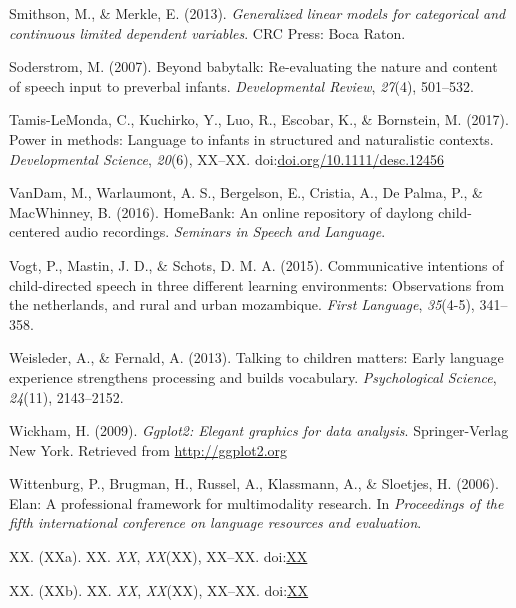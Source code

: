 \documentclass[floatsintext,man]{apa6}
\theoremstyle{definition}
\theoremstyle{definition}
\theoremstyle{definition}
\theoremstyle{remark}
\begin{document}
\hypertarget{ref-smithson2013generalized}{}
Smithson, M., \& Merkle, E. (2013). \emph{Generalized linear models for
categorical and continuous limited dependent variables}. CRC Press: Boca
Raton.

\hypertarget{ref-soderstrom2007beyond}{}
Soderstrom, M. (2007). Beyond babytalk: Re-evaluating the nature and
content of speech input to preverbal infants. \emph{Developmental
Review}, \emph{27}(4), 501--532.

\hypertarget{ref-tamislemonda2017power}{}
Tamis-LeMonda, C., Kuchirko, Y., Luo, R., Escobar, K., \& Bornstein, M.
(2017). Power in methods: Language to infants in structured and
naturalistic contexts. \emph{Developmental Science}, \emph{20}(6),
XX--XX.
doi:\href{https://doi.org/doi.org/10.1111/desc.12456}{doi.org/10.1111/desc.12456}

\hypertarget{ref-HomeBank}{}
VanDam, M., Warlaumont, A. S., Bergelson, E., Cristia, A., De Palma, P.,
\& MacWhinney, B. (2016). HomeBank: An online repository of daylong
child-centered audio recordings. \emph{Seminars in Speech and Language}.

\hypertarget{ref-vogt2015communicative}{}
Vogt, P., Mastin, J. D., \& Schots, D. M. A. (2015). Communicative
intentions of child-directed speech in three different learning
environments: Observations from the netherlands, and rural and urban
mozambique. \emph{First Language}, \emph{35}(4-5), 341--358.

\hypertarget{ref-weisleder2013talking}{}
Weisleder, A., \& Fernald, A. (2013). Talking to children matters: Early
language experience strengthens processing and builds vocabulary.
\emph{Psychological Science}, \emph{24}(11), 2143--2152.

\hypertarget{ref-R-ggplot2}{}
Wickham, H. (2009). \emph{Ggplot2: Elegant graphics for data analysis}.
Springer-Verlag New York. Retrieved from \url{http://ggplot2.org}

\hypertarget{ref-ELAN}{}
Wittenburg, P., Brugman, H., Russel, A., Klassmann, A., \& Sloetjes, H.
(2006). Elan: A professional framework for multimodality research. In
\emph{Proceedings of the fifth international conference on language
resources and evaluation}.

\hypertarget{ref-lucidIP}{}
XX. (XXa). XX. \emph{XX}, \emph{XX}(XX), XX--XX.
doi:\href{https://doi.org/XX}{XX}

\hypertarget{ref-frankIP}{}
XX. (XXb). XX. \emph{XX}, \emph{XX}(XX), XX--XX.
doi:\href{https://doi.org/XX}{XX}

\endgroup
\end{document}
